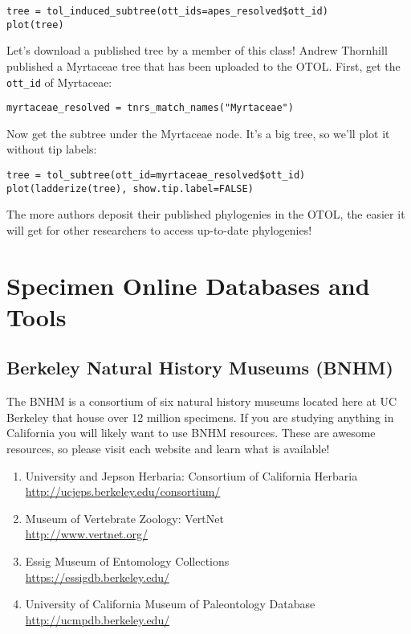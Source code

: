 \documentclass[11pt]{article}
\begin{document}
\begin{verbatim}
tree = tol_induced_subtree(ott_ids=apes_resolved$ott_id)
plot(tree)
\end{verbatim}

Let's download a published tree by a member of this class!
Andrew Thornhill published a Myrtaceae tree that has been uploaded to the OTOL.
First, get the \texttt{ott\_id} of Myrtaceae:

\begin{verbatim}
myrtaceae_resolved = tnrs_match_names("Myrtaceae")
\end{verbatim}

Now get the subtree under the Myrtaceae node.
It's a big tree, so we'll plot it without tip labels:

\begin{verbatim}
tree = tol_subtree(ott_id=myrtaceae_resolved$ott_id)
plot(ladderize(tree), show.tip.label=FALSE)
\end{verbatim}

The more authors deposit their published phylogenies in the OTOL,
the easier it will get for other researchers to access up-to-date
phylogenies!

\section{Specimen Online Databases and Tools}


\subsection{Berkeley Natural History Museums (BNHM)}

The BNHM is a consortium of six natural history museums located here at UC Berkeley
that house over 12 million specimens. If you are studying anything in California
you will likely want to use BNHM resources.
These are awesome resources, so please visit each website and learn what is available!

\begin{enumerate}

\item University and Jepson Herbaria: Consortium of California Herbaria \\
        \url{http://ucjeps.berkeley.edu/consortium/}

\item Museum of Vertebrate Zoology: VertNet \\
            \url{http://www.vertnet.org/}

\item Essig Museum of Entomology Collections \\ 
        \url{https://essigdb.berkeley.edu/}

\item University of California Museum of Paleontology Database \\
        \url{http://ucmpdb.berkeley.edu/}

\end{enumerate}
\end{document}
